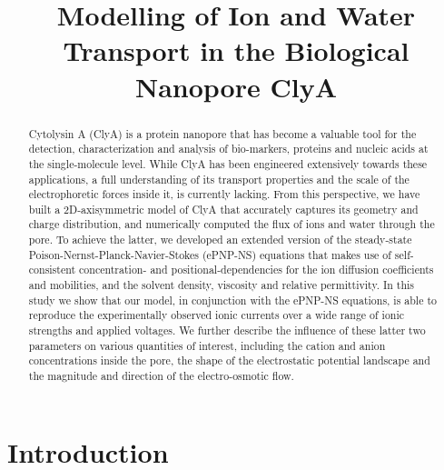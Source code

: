 \documentclass[journal=ancac3,manuscript=article,etalmode=truncate,maxauthors=0,layout=twocolumn]{achemso}
\title{Modelling of Ion and Water Transport in the Biological Nanopore ClyA}
\begin{document}

\begin{abstract}
\footnotesize
Cytolysin A (ClyA) is a protein nanopore that has become a valuable tool for the detection, characterization 
and analysis of bio-markers, proteins and nucleic acids at the single-molecule level.  While ClyA has been 
engineered extensively towards these applications, a full understanding of its transport properties and the 
scale of the electrophoretic forces inside it, is currently lacking. From this perspective, we have built a 
2D-axisymmetric model of ClyA that accurately captures its geometry and charge distribution, and numerically 
computed the flux of ions and water through the pore. To achieve the latter, we developed an extended version 
of the steady-state Poison-Nernst-Planck-Navier-Stokes (ePNP-NS) equations that makes use of self-consistent 
concentration- and positional-dependencies for the ion diffusion coefficients and mobilities, and the solvent 
density, viscosity and relative permittivity. In this study we show that our model, in conjunction with the 
ePNP-NS equations, is able to reproduce the experimentally observed ionic currents over a wide range of ionic 
strengths and applied voltages. We further describe the influence of these latter two parameters on various 
quantities of interest, including the cation and anion concentrations inside the pore, the shape of the 
electrostatic potential landscape and the magnitude and direction of the electro-osmotic flow.
\end{abstract}

\section{Introduction}
\end{document}
